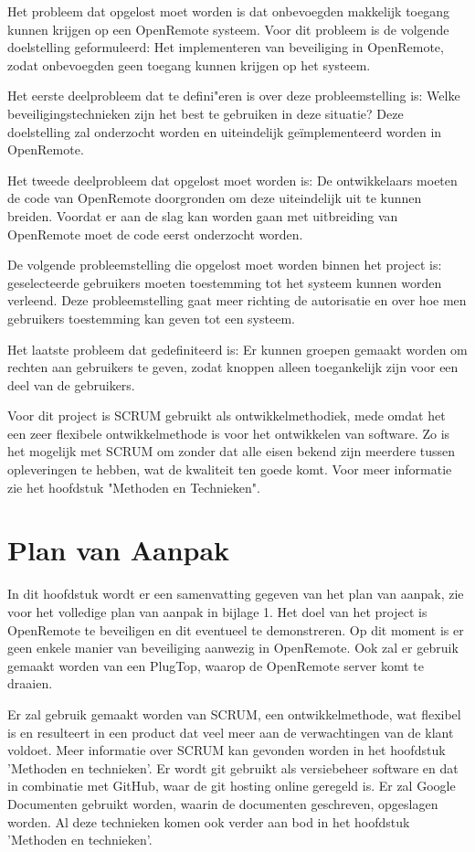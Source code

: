 \documentclass[]{article}
\begin{document}
Het probleem dat opgelost moet worden is dat onbevoegden makkelijk toegang
kunnen krijgen op een OpenRemote systeem. Voor dit probleem is de
volgende doelstelling geformuleerd: Het implementeren van beveiliging in
OpenRemote, zodat onbevoegden geen toegang kunnen krijgen op het systeem.

Het eerste deelprobleem dat te defini"eren is over deze probleemstelling is:
Welke beveiligingstechnieken zijn het best te gebruiken in deze situatie?
Deze doelstelling zal onderzocht worden en uiteindelijk ge\"implementeerd worden in OpenRemote.

Het tweede deelprobleem dat opgelost moet worden is: De ontwikkelaars
moeten de code van OpenRemote doorgronden om deze uiteindelijk uit te
kunnen breiden. Voordat er aan de slag kan worden gaan met uitbreiding van
OpenRemote moet de code eerst onderzocht worden.

De volgende probleemstelling die opgelost moet worden binnen het project
is: geselecteerde gebruikers moeten toestemming tot het systeem kunnen worden
verleend. Deze probleemstelling gaat meer richting de autorisatie en over
hoe men gebruikers toestemming kan geven tot een systeem.

Het laatste probleem dat gedefiniteerd is: Er kunnen groepen gemaakt worden om
rechten aan gebruikers te geven, zodat knoppen alleen toegankelijk zijn voor een deel van de gebruikers. 

Voor dit project is SCRUM gebruikt als ontwikkelmethodiek, mede omdat het een
zeer flexibele ontwikkelmethode is voor het ontwikkelen van software. Zo is het
mogelijk met SCRUM om zonder dat alle eisen bekend zijn meerdere tussen
opleveringen te hebben, wat de kwaliteit ten goede komt. Voor meer
informatie zie het hoofdstuk "Methoden en Technieken".

\newpage
\section{Plan van Aanpak}

In dit hoofdstuk wordt er een samenvatting gegeven van het plan van aanpak,
zie voor het volledige plan van aanpak in bijlage 1. Het doel van het 
project is OpenRemote  te  beveiligen  en  dit  eventueel  te
demonstreren. Op dit moment is er geen enkele manier van beveiliging aanwezig
in OpenRemote. Ook zal er gebruik gemaakt worden van een PlugTop, waarop  de
OpenRemote server komt te draaien.

Er zal gebruik gemaakt worden van  SCRUM, een ontwikkelmethode, wat flexibel is en resulteert in een product dat  veel
meer aan de verwachtingen van de klant voldoet. Meer informatie  over  SCRUM
kan gevonden worden in het hoofdstuk 'Methoden en technieken'.
Er wordt git gebruikt als versiebeheer software en  dat  in  combinatie  met
GitHub, waar de git hosting online geregeld is.  Er  zal  Google  Documenten
gebruikt worden, waarin de documenten geschreven, opgeslagen worden.
Al deze technieken komen ook verder aan bod in het  hoofdstuk  'Methoden  en
technieken'.
\end{document}
